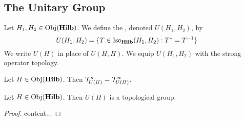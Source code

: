 \documentclass{book}
\begin{document}
	
	
	
	
	
	
	
	
	
	
	
	
	
	
	
	
	
	
	
	
	
	
	
	
	
	
	
	
	
	
	
	
	\subsection{The Unitary Group}
	
	\begin{defn}
		Let $H_1, H_2 \in \operatorname{Obj}(\operatorname*{\text{\textbf{Hilb}}})$. We define the , denoted $U(H_1, H_2)$, by 
		$$U(H_1, H_2) = \{T \in \operatorname{Iso}_{\operatorname*{\text{\textbf{Hilb}}}}(H_1, H_2): T^* = T^{-1}\}$$ 
		We write $U(H)$ in place of $U(H,H)$. We equip $U(H_1, H_2)$ with the strong operator topology. 
	\end{defn}
	
	\begin{ex}
		Let $H \in \operatorname{Obj}(\operatorname*{\text{\textbf{Hilb}}})$. Then $\mathcal{T}_{U(H)}^s = \mathcal{T}_{U(H)}^w$. 
	\end{ex}
	
	\begin{ex}
		Let $H \in \operatorname{Obj}(\operatorname*{\text{\textbf{Hilb}}})$. Then $U(H)$ is a topological group.
	\end{ex}
	
	\begin{proof}
		content...
	\end{proof}
	
	
	
	
	
	
	
	
	
	
	
	
	
	
	
	
	
	
	
	
	
	
	
	
	
	
	
	
	
\end{document}
